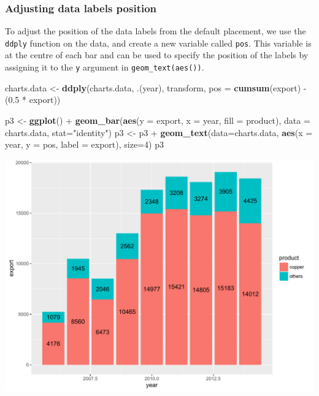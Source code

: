 \documentclass[]{article}
\newenvironment{Shaded}{\begin{snugshade}}{\end{snugshade}}
\newcommand{\KeywordTok}[1]{\textcolor[rgb]{0.13,0.29,0.53}{\textbf{{#1}}}}
\newcommand{\DataTypeTok}[1]{\textcolor[rgb]{0.13,0.29,0.53}{{#1}}}
\newcommand{\DecValTok}[1]{\textcolor[rgb]{0.00,0.00,0.81}{{#1}}}
\newcommand{\FloatTok}[1]{\textcolor[rgb]{0.00,0.00,0.81}{{#1}}}
\newcommand{\StringTok}[1]{\textcolor[rgb]{0.31,0.60,0.02}{{#1}}}
\newcommand{\NormalTok}[1]{{#1}}
\begin{document}
\subsubsection{Adjusting data labels
position}\label{adjusting-data-labels-position}

To adjust the position of the data labels from the default placement, we
use the \texttt{ddply} function on the data, and create a new variable
called \texttt{pos}. This variable is at the centre of each bar and can
be used to specify the position of the labels by assigning it to the
\texttt{y} argument in \texttt{geom\_text(aes())}.

\begin{Shaded}
\begin{Highlighting}[]
\NormalTok{charts.data <-}\StringTok{ }\KeywordTok{ddply}\NormalTok{(charts.data, .(year), transform, }\DataTypeTok{pos =} \KeywordTok{cumsum}\NormalTok{(export) -}\StringTok{ }\NormalTok{(}\FloatTok{0.5} \NormalTok{*}\StringTok{ }\NormalTok{export))}

\NormalTok{p3 <-}\StringTok{ }\KeywordTok{ggplot}\NormalTok{() +}\StringTok{ }\KeywordTok{geom_bar}\NormalTok{(}\KeywordTok{aes}\NormalTok{(}\DataTypeTok{y =} \NormalTok{export, }\DataTypeTok{x =} \NormalTok{year, }\DataTypeTok{fill =} \NormalTok{product), }\DataTypeTok{data =} \NormalTok{charts.data, }
                          \DataTypeTok{stat=}\StringTok{"identity"}\NormalTok{) }
\NormalTok{p3 <-}\StringTok{ }\NormalTok{p3 +}\StringTok{ }\KeywordTok{geom_text}\NormalTok{(}\DataTypeTok{data=}\NormalTok{charts.data, }\KeywordTok{aes}\NormalTok{(}\DataTypeTok{x =} \NormalTok{year, }\DataTypeTok{y =} \NormalTok{pos, }\DataTypeTok{label =} \NormalTok{export), }\DataTypeTok{size=}\DecValTok{4}\NormalTok{)}
\NormalTok{p3}
\end{Highlighting}
\end{Shaded}

\begin{center}\includegraphics{0_all_posts_pdf/bar_3-1} \end{center}
\end{document}
